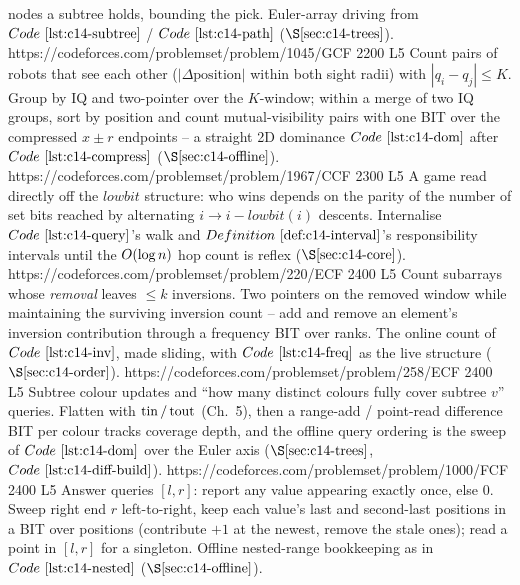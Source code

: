 \begin{mixedset}
{     nodes a subtree holds, bounding the pick. Euler-array driving from
     \(\coderef{c14-subtree}\) / \(\coderef{c14-path}\) (\(\secref{c14-trees}\)).}
    {https://codeforces.com/problemset/problem/1045/G}{CF 2200 L5}
    {Count pairs of robots that see each other (\(|\Delta\text{position}|\) within
     both sight radii) with \(|q_i-q_j|\le K\). Group by IQ and two-pointer over
     the \(K\)-window; within a merge of two IQ groups, sort by position and count
     mutual-visibility pairs with one BIT over the compressed \(x\pm r\) endpoints
     -- a straight 2D dominance \(\coderef{c14-dom}\) after
     \(\coderef{c14-compress}\) (\(\secref{c14-offline}\)).}
    {https://codeforces.com/problemset/problem/1967/C}{CF 2300 L5}
    {A game read directly off the \(\mathit{lowbit}\) structure: who wins depends on
     the parity of the number of set bits reached by alternating
     \(i\!\to\!i-\mathit{lowbit}(i)\) descents. Internalise \(\coderef{c14-query}\)'s
     walk and \(\defref{c14-interval}\)'s responsibility intervals until the
     \(O(\log n)\) hop count is reflex (\(\secref{c14-core}\)).}
    {https://codeforces.com/problemset/problem/220/E}{CF 2400 L5}
    {Count subarrays whose \emph{removal} leaves \(\le k\) inversions. Two pointers
     on the removed window while maintaining the surviving inversion count -- add
     and remove an element's inversion contribution through a frequency BIT over
     ranks. The online count of \(\coderef{c14-inv}\), made sliding, with
     \(\coderef{c14-freq}\) as the live structure (\(\secref{c14-order}\)).}
    {https://codeforces.com/problemset/problem/258/E}{CF 2400 L5}
    {Subtree colour updates and ``how many distinct colours fully cover subtree
     \(v\)'' queries. Flatten with \(\operatorname{tin}/\operatorname{tout}\) (Ch.~5), then a range-add /
     point-read difference BIT per colour tracks coverage depth, and the offline
     query ordering is the sweep of \(\coderef{c14-dom}\) over the Euler axis
     (\(\secref{c14-trees}\), \(\coderef{c14-diff-build}\)).}
    {https://codeforces.com/problemset/problem/1000/F}{CF 2400 L5}
    {Answer queries \([l,r]\): report any value appearing exactly once, else \(0\).
     Sweep right end \(r\) left-to-right, keep each value's last and second-last
     positions in a BIT over positions (contribute \(+1\) at the newest, remove the
     stale ones); read a point in \([l,r]\) for a singleton. Offline nested-range
     bookkeeping as in \(\coderef{c14-nested}\) (\(\secref{c14-offline}\)).}
\end{mixedset}

